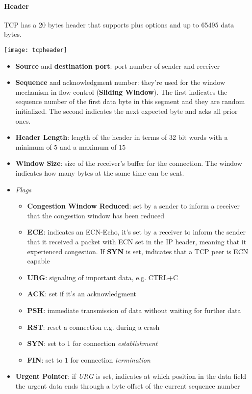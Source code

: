 \paragraph{Header} TCP has a 20 bytes header that supports plus options and up to 65495 data bytes.
\begin{center}
	\texttt{[image: tcpheader]}
\end{center}
\begin{itemize}
	\item \textbf{Source} and \textbf{destination port}: port number of sender and receiver
	\item \textbf{Sequence} and {acknowledgment number}: they're used for the window mechanism in flow control (\textbf{Sliding Window}). The first indicates the sequence number of the first data byte in this segment and they are random initialized. The second indicates the next expected byte and acks all prior ones.
	\item \textbf{Header Length}: length of the header in terms of 32 bit words with a minimum of $5$ and a maximum of $15$
	\item \textbf{Window Size}: size of the receiver's buffer for the connection. The window indicates how many bytes at the same time can be sent.
	\item \textit{Flags}
	\begin{itemize}
		\item \textbf{Congestion Window Reduced}: set by a sender to inform a receiver that the congestion window has been reduced
		\item \textbf{ECE}: indicates an ECN-Echo, it's set by a receiver to inform the sender that it received a packet with ECN set in the IP header, meaning that it experienced congestion. If \textbf{SYN} is set, indicates that a TCP peer is ECN capable
		\item \textbf{URG}: signaling of important data, e.g. CTRL+C
		\item \textbf{ACK}: set if it's an acknowledgment
		\item \textbf{PSH}: immediate transmission of data without waiting for further data
		\item \textbf{RST}: reset a connection e.g. during a crash
		\item \textbf{SYN}: set to $1$ for connection \textit{establishment}
		\item \textbf{FIN}: set to $1$ for connection \textit{termination}
	\end{itemize}
	\item \textbf{Urgent Pointer}: if \textit{URG} is set, indicates at which position in the data field the urgent data ends through a byte offset of the current sequence number

\end{itemize}
